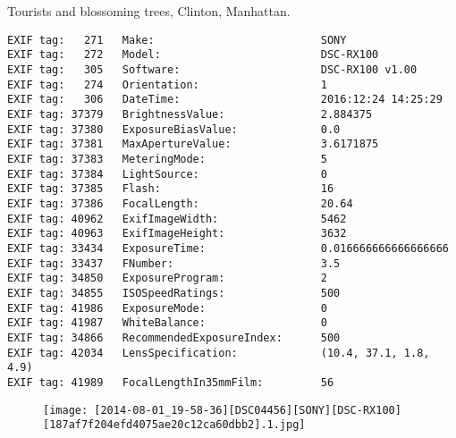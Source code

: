 \section{\protect{}}
\noindent Tourists and blossoming trees, Clinton, Manhattan.
\noindent
\begin{lstlisting}
EXIF tag:   271   Make:                          SONY
EXIF tag:   272   Model:                         DSC-RX100
EXIF tag:   305   Software:                      DSC-RX100 v1.00
EXIF tag:   274   Orientation:                   1
EXIF tag:   306   DateTime:                      2016:12:24 14:25:29
EXIF tag: 37379   BrightnessValue:               2.884375
EXIF tag: 37380   ExposureBiasValue:             0.0
EXIF tag: 37381   MaxApertureValue:              3.6171875
EXIF tag: 37383   MeteringMode:                  5
EXIF tag: 37384   LightSource:                   0
EXIF tag: 37385   Flash:                         16
EXIF tag: 37386   FocalLength:                   20.64
EXIF tag: 40962   ExifImageWidth:                5462
EXIF tag: 40963   ExifImageHeight:               3632
EXIF tag: 33434   ExposureTime:                  0.016666666666666666
EXIF tag: 33437   FNumber:                       3.5
EXIF tag: 34850   ExposureProgram:               2
EXIF tag: 34855   ISOSpeedRatings:               500
EXIF tag: 41986   ExposureMode:                  0
EXIF tag: 41987   WhiteBalance:                  0
EXIF tag: 34866   RecommendedExposureIndex:      500
EXIF tag: 42034   LensSpecification:             (10.4, 37.1, 1.8, 4.9)
EXIF tag: 41989   FocalLengthIn35mmFilm:         56

\end{lstlisting}
\clearpage
\begin{figure}
\raggedleft
\texttt{[image: [2014-08-01\_19-58-36][DSC04456][SONY][DSC-RX100][187af7f204efd4075ae20c12ca60dbb2].1.jpg]}
\end{figure}


\clearpage
